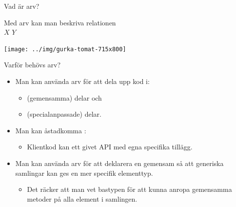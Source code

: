 



\ifkompendium\else


\begin{Slide}{Vad är arv?}

\begin{minipage}{0.4\textwidth}
\raggedright Med arv kan man beskriva relationen \\
$X$  $Y$

\end{minipage}
\begin{minipage}{0.4\textwidth}
\texttt{[image: ../img/gurka-tomat-715x800]}
\end{minipage} 
\end{Slide}


\begin{Slide}{Varför behövs arv?}
\begin{itemize}
\item Man kan använda arv för att dela upp kod i: 
\begin{itemize}
\item {} (gemensamma) delar och 
\item {} (specialanpassade) delar.
\end{itemize}

\item Man kan åstadkomma : 
\begin{itemize}
\item Klientkod kan   ett givet API med egna specifika tillägg.
\end{itemize}

\item Man kan använda arv för att deklarera en gemensam  så att generiska samlingar kan ges en mer specifik elementtyp. 
\begin{itemize}
\item Det räcker att man vet bastypen för att kunna anropa gemensamma metoder på alla element i samlingen.
\end{itemize}
\end{itemize}
\end{Slide}


